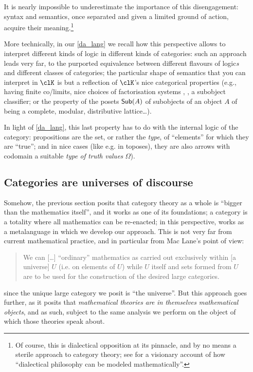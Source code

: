It is nearly impossible to underestimate the importance of this disengagement: syntax and semantics, once separated and given a limited ground of action, acquire their meaning.\footnote{Of course, this is dialectical opposition at its pinnacle, and by no means a sterile approach to category theory; see \cite{lawvere1996unity} for a visionary account of how ``dialectical philosophy can be modeled mathematically''.}

More technically, in our \autoref{da_lang} we recall how this perspective allows to interpret different kinds of logic in different kinds of categories: such an approach leads very far, to the purported equivalence between different flavours of logic\emph{s} and different classes of categories; the particular shape of semantics that you can interpret in $\clK$ is but a reflection of $\clK$'s nice categorical properties (e.g., having finite co/limits, nice choices of factorisation systems \cite[5.5]{Bor1}, \cite{FK}, a subobject classifier; or the property of the posets $\mathsf{Sub}(A)$ of subobjects of an object $A$ of being a complete, modular, distributive lattice\dots).

In light of \autoref{da_lang}, this last property has to do with the internal logic of the category: propositions are the set, or rather the \emph{type}, of ``elements'' for which they are ``true''; and in nice cases (like e.g. in toposes), they are also arrows with codomain a suitable \emph{type of truth values} $\Omega$).
\subsection{Categories are universes of discourse}
Somehow, the previous section posits that category theory as a whole is ``bigger than the mathematics itself'', and it works as one of its foundations; a category is a totality where all mathematics can be re-enacted; in this perspective,  works as a metalanguage in which we develop our approach. This is not very far from current mathematical practice, and in particular from Mac Lane's point of view:
\begin{quote}
	We can [\dots\unkern] ``ordinary'' mathematics as carried out exclusively within [a universe] $U$ (i.e. on elements of $U$) while $U$ itself and sets formed from $U$ are to be used for the construction of the desired large categories.\hfill \cite[I.6]{McL}
\end{quote}
since the unique large category we posit is ``the universe''. But this approach goes further, as it posits that \emph{mathematical theories are in themselves mathematical objects}, and as such, subject to the same analysis we perform on the object of which those theories speak about.

